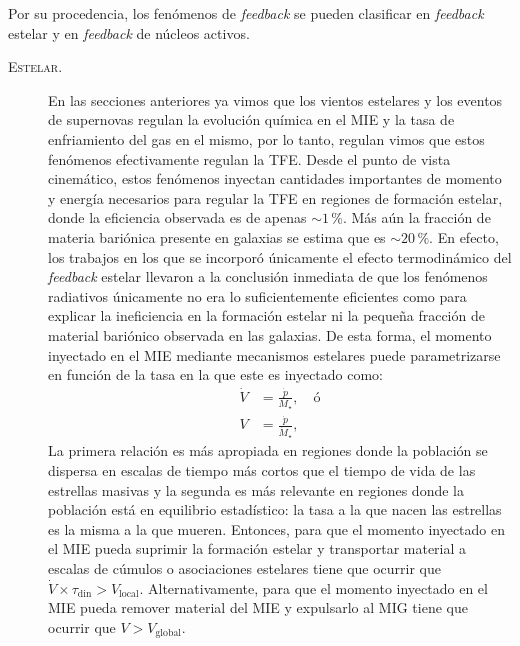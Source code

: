 \documentclass{article}
\begin{document}
Por su procedencia, los fenómenos de \emph{feedback} se pueden clasificar en \emph{feedback} estelar
y en \emph{feedback} de núcleos activos.
%
\begin{description}
%
\item[\textsc{Estelar.}] En las secciones anteriores ya vimos que los vientos estelares y los
eventos de supernovas regulan la evolución química en el MIE y la tasa de enfriamiento del gas en el
mismo, por lo tanto, regulan vimos que estos fenómenos efectivamente regulan la TFE. Desde el punto
de vista cinemático, estos fenómenos inyectan cantidades importantes de momento y energía necesarios
para regular la TFE en regiones de formación estelar, donde la eficiencia observada es de apenas
$\sim1\,\%$. Más aún la fracción de materia bariónica presente en galaxias se estima que es
$\sim20\,\%$. En efecto, los trabajos en los que se incorporó únicamente el efecto termodinámico del
\emph{feedback} estelar llevaron a la conclusión inmediata de que los fenómenos radiativos
únicamente no era lo suficientemente eficientes como para explicar la ineficiencia en la formación
estelar ni la pequeña fracción de material bariónico observada en las galaxias. De esta forma, el
momento inyectado en el MIE mediante mecanismos estelares puede parametrizarse en función de la
tasa en la que este es inyectado como:
%
\begin{align}
\dot{V} &= \frac{\dot{p}}{M_\star},\quad\text{ó}\nonumber\\
V       &= \frac{\dot{p}}{\dot{M}_\star},\nonumber
\end{align}
%
La primera relación es más apropiada en regiones donde la población se dispersa en escalas de tiempo
más cortos que el tiempo de vida de las estrellas masivas y la segunda es más relevante en regiones
donde la población está en equilibrio estadístico: la tasa a la que nacen las estrellas es la misma
a la que mueren. Entonces, para que el momento inyectado en el MIE pueda suprimir la formación
estelar y transportar material a escalas de cúmulos o asociaciones estelares tiene que ocurrir que
$\dot{V}\times\tau_\text{din}> V_\text{local}$. Alternativamente, para que el momento
inyectado en el MIE pueda remover material del MIE y expulsarlo al MIG tiene que ocurrir que
$V> V_\text{global}$.


\end{description}
\end{document}
